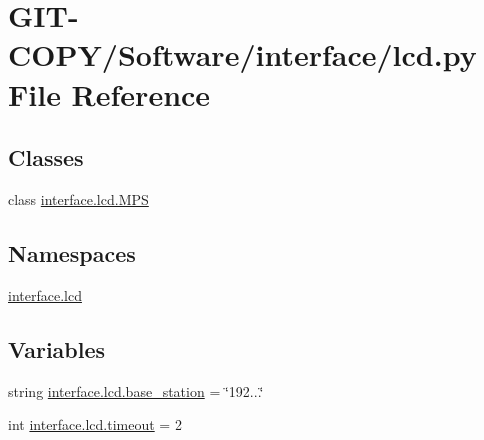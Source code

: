 \hypertarget{GIT-COPY_2Software_2interface_2lcd_8py}{}\section{G\+I\+T-\/\+C\+O\+P\+Y/\+Software/interface/lcd.py File Reference}
\label{GIT-COPY_2Software_2interface_2lcd_8py}
\subsection*{Classes}
\begin{DoxyCompactItemize}
\item 
class \hyperlink{classinterface_1_1lcd_1_1MPS}{interface.\+lcd.\+M\+P\+S}
\end{DoxyCompactItemize}
\subsection*{Namespaces}
\begin{DoxyCompactItemize}
\item 
 \hyperlink{namespaceinterface_1_1lcd}{interface.\+lcd}
\end{DoxyCompactItemize}
\subsection*{Variables}
\begin{DoxyCompactItemize}
\item 
string \hyperlink{namespaceinterface_1_1lcd_aa894a538bef8baf28538703a7febc04f}{interface.\+lcd.\+base\+\_\+station} = \char`\"{}192...\char`\"{}
\item 
int \hyperlink{namespaceinterface_1_1lcd_a8b9b984cbc82f678d686eaca48a1276d}{interface.\+lcd.\+timeout} = 2
\end{DoxyCompactItemize}
